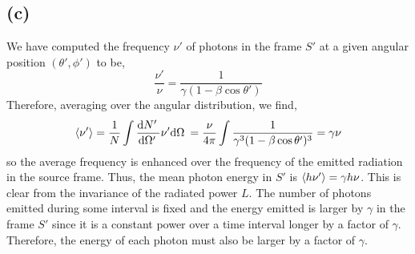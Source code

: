 \documentclass[12pt]{article}
\begin{document}
\subsection*{(c)}   

We have computed the frequency $\nu'$ of photons in the frame $S'$ at a given angular position $(\theta', \phi')$ to be,
\[ \frac{\nu'}{\nu} = \frac{1}{\gamma (1 - \beta \cos{\theta'})} \]  
Therefore, averaging over the angular distribution, we find,
\[ \left< \nu' \right> = \frac{1}{N} \int \frac{\mathrm{d}N' \:}{\mathrm{d}\Omega' \:} \nu' \mathrm{d}\Omega \: = \frac{\nu}{4 \pi} \int \frac{1}{\gamma^3 (1 - \beta \cos{\theta'})^3} = \gamma \nu \]
so the average frequency is enhanced over the frequency of the emitted radiation in the source frame. Thus, the mean photon energy in $S'$ is $\left< h\nu' \right> = \gamma h \nu$. This is clear from the invariance of the radiated power $L$. The number of photons emitted during some interval is fixed and the energy emitted is larger by $\gamma$ in the frame $S'$ since it is a constant power over a time interval longer by a factor of $\gamma$. Therefore, the energy of each photon must also be larger by a factor of $\gamma$.  
\end{document}
